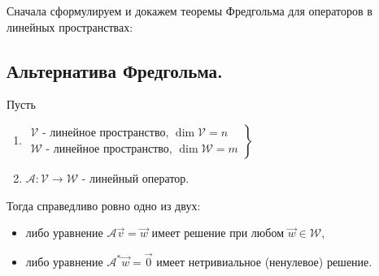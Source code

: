 Сначала сформулируем и докажем теоремы Фредгольма для операторов в линейных пространствах:

\subsection{
    Альтернатива Фредгольма.
}

\begin{theorem} Пусть

    \begin{enumerate}
        \item $\left.\begin{array}{l}
            \mathcal{V} \text{ - линейное пространство, } \dim \mathcal{V} = n \\
            \mathcal{W} \text{ - линейное пространство, } \dim \mathcal{W} = m
        \end{array}\right\}$ 
        \item $\mathscr{A} \colon \mathcal{V} \to \mathcal{W}$ - линейный оператор.
    \end{enumerate}

    Тогда справедливо ровно одно из двух:

    \begin{itemize}[nosep]
        \item либо уравнение $\mathscr{A}\vec{v} = \vec{w}$ имеет решение при любом $\vec{w} \in \mathcal{W}$,
        \item либо уравнение $\mathscr{A^*}\vec{w} = \vec{0}$ имеет нетривиальное (ненулевое) решение.
    \end{itemize}
\end{theorem}

